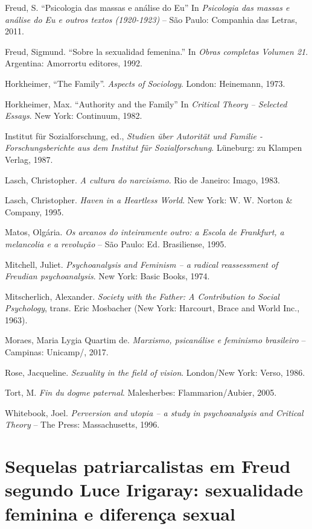 Freud, S. ``Psicologia das massas e análise do Eu'' In
\emph{Psicologia das massas e análise do Eu e outros textos (1920-1923)}
-- São Paulo: Companhia das Letras, 2011.

Freud, Sigmund. ``Sobre la sexualidad femenina.'' In \emph{Obras
completas Volumen 21}. Argentina: Amorrortu editores, 1992.

Horkheimer, ``The Family''. \emph{Aspects of Sociology}. London:
Heinemann, 1973.

Horkheimer, Max. ``Authority and the Family'' In \emph{Critical Theory
-- Selected Essays}. New York: Continuum, 1982.

Institut für Sozialforschung, ed., \emph{Studien über Autorität und
Familie - Forschungsberichte aus dem Institut für Sozialforschung}.
Lüneburg: zu Klampen Verlag, 1987.

Lasch, Christopher. \emph{A cultura do narcisismo}. Rio de Janeiro:
Imago, 1983.

Lasch, Christopher. \emph{Haven in a Heartless World}. New York: W. W.
Norton \& Company, 1995.

Matos, Olgária. \emph{Os arcanos do inteiramente outro: a Escola de
Frankfurt, a melancolia e a revolução} -- São Paulo: Ed. Brasiliense,
1995.

Mitchell, Juliet. \emph{Psychoanalysis and Feminism -- a radical
reassessment of Freudian psychoanalysis}. New York: Basic Books, 1974.

Mitscherlich, Alexander. \emph{Society with the Father: A Contribution
to Social Psychology}, trans. Eric Mosbacher (New York: Harcourt, Brace
and World Inc., 1963).

Moraes, Maria Lygia Quartim de. \emph{Marxismo, psicanálise e
feminismo brasileiro} -- Campinas: Unicamp/, 2017.

Rose, Jacqueline. \emph{Sexuality in the field of vision}. London/New
York: Verso, 1986.

Tort, M. \emph{Fin du dogme paternal}. Malesherbes: Flammarion/Aubier,
2005.

Whitebook, Joel. \emph{Perversion and utopia -- a study in
psychoanalysis and Critical Theory} -- The  Press: Massachusetts,
1996.


\chapter*{Sequelas patriarcalistas em Freud segundo Luce Irigaray:
sexualidade feminina e diferença sexual}


